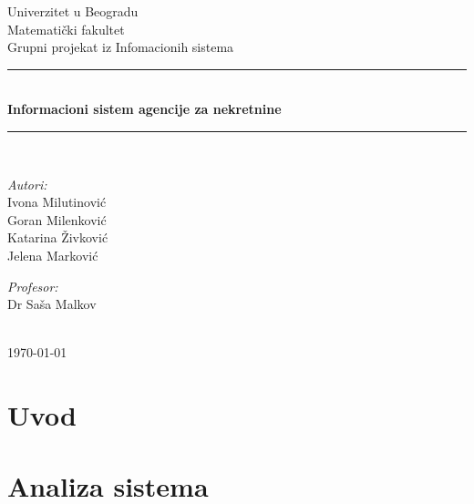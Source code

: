 \documentclass{article}
\begin{document}
\begin{titlepage}

\newcommand{\HRule}{\rule{\linewidth}{0.5mm}}
\center
\textup{\Large Univerzitet u Beogradu\\Matemati\v{c}ki fakultet}\\[1.5cm]
\textup{\Large Grupni projekat iz Infomacionih sistema}\\[0.4cm]

\HRule \\[0.4cm]
{ \huge \bfseries Informacioni sistem agencije za nekretnine}\\[0.4cm]
\HRule \\[8.5cm]

\begin{minipage}{0.4\textwidth}
\begin{flushleft}
\large
\emph{Autori:}\\
\textup Ivona Milutinovi\' c\\
\textup Goran Milenkovi\' c\\
\textup Katarina \v Zivkovi\' c\\
\textup Jelena Markovi\' c

\end{flushleft}
\end{minipage}
\hfill
\begin{minipage}{0.4\textwidth}
\begin{flushright}
\large
\emph{Profesor:} \\
\textup Dr Sa\v sa Malkov\\
\end{flushright}
\end{minipage}\\[2cm]


{\textup \large \today}\\[1cm]

\end{titlepage}

\newpage
\tableofcontents

\newpage
\section{\bfseries Uvod}

\newpage
\section{\bfseries Analiza sistema}

\newpage
\end{document}
